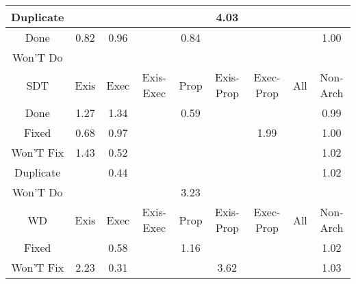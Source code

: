 \begin{tabular}{|c||c|c|c|c|c|c|c|c|}
\hline
Duplicate &  &  &  &  & \cellcolor[rgb]{0.53,0.66,0.42} 4.03 &  &  &  \\ 
\hline
Done & \cellcolor[rgb]{0.8769222163992632,0.6834318242898451,0.3891274019726455} 0.82 & \cellcolor[rgb]{0.9019643917614116,0.8019647876706812,0.41250009897731743} 0.96 &  & \cellcolor[rgb]{0.8805459232292606,0.7005840366185,0.39250952834730984} 0.84 &  &  &  & \cellcolor[rgb]{0.9094943547733182,0.8397604838399928,0.42} 1.00 \\ 
\hline
Won'T Do &  &  &  &  &  &  &  &  \\ 
\hline
\hline
SDT & Exis & Exec & Exis-Exec & Prop & Exis-Prop & Exec-Prop & All & Non-Arch \\ 
\hline
Done & \cellcolor[rgb]{0.8766755087371844,0.8242147146649821,0.42} 1.27 & \cellcolor[rgb]{0.8679534406239693,0.820083208716617,0.42} 1.34 &  & \cellcolor[rgb]{0.8335249637317199,0.4780181616634744,0.3486232994829386} 0.59 &  &  &  & \cellcolor[rgb]{0.9077140943648752,0.8291800466604087,0.4178664880738834} 0.99 \\ 
\hline
Fixed & \cellcolor[rgb]{0.8500180958623205,0.5560856537483165,0.364016889471499} 0.68 & \cellcolor[rgb]{0.9036534759895576,0.8099597863505723,0.4140765775902537} 0.97 &  &  &  & \cellcolor[rgb]{0.7856615594432264,0.7811028439467914,0.42} 1.99 &  & \cellcolor[rgb]{0.9097859050147974,0.8398985865859566,0.42} 1.00 \\ 
\hline
Won'T Fix & \cellcolor[rgb]{0.855650386805493,0.8142554463815492,0.41999999999999993} 1.43 & \cellcolor[rgb]{0.8206371075981279,0.41701564263113894,0.33659463375825277} 0.52 &  &  &  &  &  & \cellcolor[rgb]{0.9079555461853126,0.8390315745088321,0.42} 1.02 \\ 
\hline
Duplicate &  & \cellcolor[rgb]{0.8065886095929709,0.3505194187400617,0.3234827022867727} 0.44 &  &  &  &  &  & \cellcolor[rgb]{0.907519974333737,0.8388252510001911,0.42} 1.02 \\ 
\hline
Won'T Do &  &  &  & \cellcolor[rgb]{0.6305034558242115,0.7076069001272581,0.42} 3.23 &  &  &  &  \\ 
\hline
\hline
WD & Exis & Exec & Exis-Exec & Prop & Exis-Prop & Exec-Prop & All & Non-Arch \\ 
\hline
Fixed &  & \cellcolor[rgb]{0.8322336167344704,0.4719057858764927,0.3474180422855056} 0.58 &  & \cellcolor[rgb]{0.8900986529375698,0.8305730461283225,0.42} 1.16 &  &  &  & \cellcolor[rgb]{0.9068748431479006,0.8385196625437424,0.42} 1.02 \\ 
\hline
Won'T Fix & \cellcolor[rgb]{0.7552492464822355,0.7666970114915852,0.42} 2.23 & \cellcolor[rgb]{0.7816844363739552,0.23263966550338766,0.30023880728235813} 0.31 &  &  & \cellcolor[rgb]{0.5819350060466415,0.6846007923378828,0.42} 3.62 &  &  & \cellcolor[rgb]{0.9056665326641954,0.8379473049461977,0.42} 1.03 \\ 

\end{tabular}
